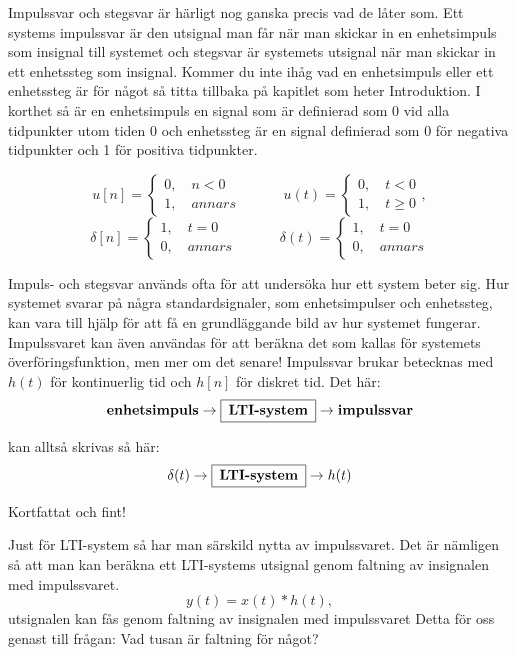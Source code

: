 \documentclass{article}
\begin{document}
Impulssvar och stegsvar är härligt nog ganska precis vad de låter som. Ett
systems impulssvar är den utsignal man får när man skickar in en enhetsimpuls
som insignal till systemet och stegsvar är systemets utsignal när man skickar
in ett enhetssteg som insignal. Kommer du inte ihåg vad en enhetsimpuls eller
ett enhetssteg är för något så titta tillbaka på kapitlet som heter
Introduktion. I korthet så är en enhetsimpuls en signal som är definierad som
0 vid alla tidpunkter utom tiden 0 och enhetssteg är en signal definierad som
0 för negativa tidpunkter och 1 för positiva tidpunkter.

$$
u[n] = \begin{cases}
    0, \quad n < 0 \\
    1, \quad annars
        \end{cases}
\quad \quad \quad
u(t) =
    \begin{cases}
    0, \quad t < 0 \\
    1, \quad t \geq 0
    \end{cases},
$$
$$
\delta[n] =
    \begin{cases}
    1, \quad t = 0 \\
    0, \quad annars
    \end{cases}
\quad \quad \quad
\delta(t) =
    \begin{cases}
    1, \quad t = 0 \\
    0, \quad annars
    \end{cases}
$$

Impuls- och stegsvar används ofta för att undersöka hur ett system beter sig.
Hur systemet svarar på några standardsignaler, som enhetsimpulser och
enhetssteg, kan vara till hjälp för att få en grundläggande bild av hur
systemet fungerar. Impulssvaret kan även användas för att beräkna det som
kallas för systemets överföringsfunktion, men mer om det senare!
\newline
Impulssvar brukar betecknas med $h(t)$ för kontinuerlig tid och $h[n]$ för diskret tid.
Det här:
$$\textbf{enhetsimpuls} \rightarrow \framebox[1.2\width]{\textbf{LTI-system}} \rightarrow \textbf{impulssvar} $$

kan alltså skrivas så här:
$$\delta (t) \rightarrow \framebox[1.2\width]{\textbf{LTI-system}} \rightarrow h(t) $$

Kortfattat och fint!
\newline

Just för LTI-system så har man särskild nytta av impulssvaret. Det är
nämligen så att man kan beräkna ett LTI-systems utsignal genom faltning av insignalen med impulssvaret.
$$ y(t)=x(t)*h(t),$$
utsignalen kan fås genom faltning av insignalen med impulssvaret
Detta för oss genast till frågan: Vad tusan är faltning för något?
\end{document}
